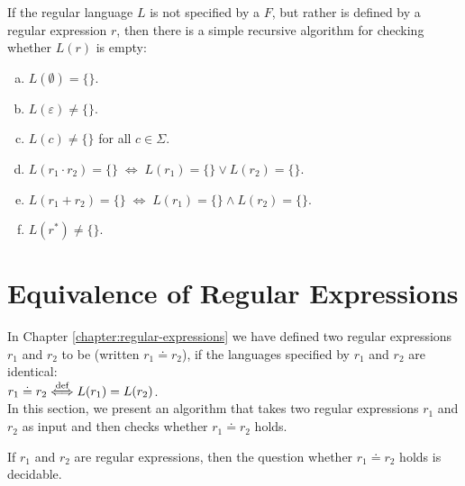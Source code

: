 \remarkEng
If the regular language  $L$ is not specified by a  $F$, but rather is defined
by a regular expression $r$, then there is a simple recursive algorithm for checking whether 
$L(r)$ is empty:
\begin{enumerate}[(a)]
\item $L(\emptyset) = \{\}$.
\item $L(\varepsilon) \not= \{\}$.
\item $L(c) \not= \{\}$ \quad for all $c \in \Sigma$.
\item $L(r_1 \cdot r_2) = \{\} \;\Leftrightarrow\; L(r_1) = \{\} \vee L(r_2) = \{\}$.
\item $L(r_1 + r_2) = \{\} \;\Leftrightarrow\; L(r_1) = \{\} \wedge L(r_2) = \{\}$.
\item $L(r^*) \not= \{\}$. \eox
\end{enumerate}


\section{Equivalence of Regular Expressions}
In Chapter \ref{chapter:regular-expressions} we have defined two regular expressions $r_1$ and $r_2$ to be  
(written $r_1 \doteq r_2$), if the languages specified by $r_1$ and $r_2$ are identical:
\\[0.2cm]
\hspace*{1.3cm}
$r_1 \doteq r_2 \stackrel{\mbox{\scriptsize def}}{\Longleftrightarrow} L(r_1) = L(r_2)$. 
\\[0.2cm]
In this section, we present an algorithm that takes two regular expressions $r_1$ and $r_2$ as input and then
checks whether $r_1 \doteq r_2$ holds. 


\begin{Theorem}
  If $r_1$ and $r_2$ are regular expressions, then the question whether $r_1 \doteq r_2$ holds is decidable.
\end{Theorem}

